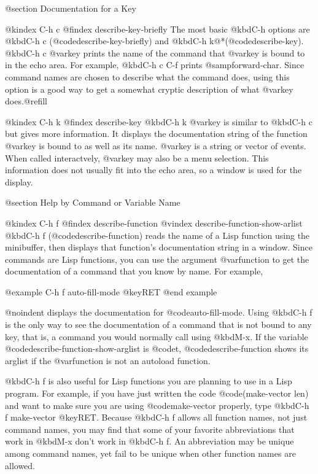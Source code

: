 {{@section Documentation for a Key

@kindex C-h c
@findex describe-key-briefly
  The most basic @kbd{C-h} options are @kbd{C-h c}
(@code{describe-key-briefly}) and @kbd{C-h k}@*(@code{describe-key}).
@kbd{C-h c @var{key}} prints the name of the command that @var{key} is
bound to in the echo area.  For example, @kbd{C-h c C-f} prints
@samp{forward-char}.  Since command names are chosen to describe what
the command does, using this option is a good way to get a somewhat cryptic
description of what @var{key} does.@refill

@kindex C-h k
@findex describe-key
  @kbd{C-h k @var{key}} is similar to @kbd{C-h c} but gives more
information.  It displays the documentation string of the function
@var{key} is bound to as well as its name.  @var{key} is a string or
vector of events.  When called interactvely, @var{key} may also be a menu
selection.  This information does not usually fit into the echo area, so a
window is used for the display.

@section Help by Command or Variable Name

@kindex C-h f
@findex describe-function
@vindex describe-function-show-arlist
  @kbd{C-h f} (@code{describe-function}) reads the name of a Lisp
function using the minibuffer, then displays that function's
documentation string in a window.  Since commands are Lisp functions,
you can use the argument @var{function} to get the documentation of a
command that you know by name.  For example,

@example
C-h f auto-fill-mode @key{RET}
@end example

@noindent
displays the documentation for @code{auto-fill-mode}. Using @kbd{C-h f}
is the only way to see the documentation of a command that is not bound
to any key, that is, a command you would normally call using @kbd{M-x}.
If the variable @code{describe-function-show-arglist} is @code{t},
@code{describe-function} shows its arglist if the @var{function} is not
an autoload function.

  @kbd{C-h f} is also useful for Lisp functions you are planning to
use in a Lisp program.  For example, if you have just written the code
@code{(make-vector len)} and want to make sure you are using
@code{make-vector} properly, type @kbd{C-h f make-vector @key{RET}}.  Because
@kbd{C-h f} allows all function names, not just command names, you may find
that some of your favorite abbreviations that work in @kbd{M-x} don't work
in @kbd{C-h f}.  An abbreviation may be unique among command names, yet fail
to be unique when other function names are allowed.


}}
